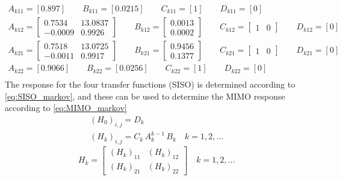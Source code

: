 \begin{equation}
    \begin{gathered}
        A_{k11}=[0.897] \qquad B_{k11}=[0.0215] \qquad C_{k11}=[1] \qquad D_{k11} = [0]\\
        A_{k12}=\begin{bmatrix} 0.7534 & 13.0837 \\ -0.0009 & 0.9926 \end{bmatrix} \qquad
        B_{k12}=\begin{bmatrix} 0.0013 \\ 0.0002 \end{bmatrix} \qquad
        C_{k12}=\begin{bmatrix} 1 & 0 \end{bmatrix} \qquad
        D_{k12} = [0]\\
        A_{k21}=\begin{bmatrix} 0.7518 & 13.0725 \\ -0.0011 & 0.9917 \end{bmatrix} \qquad
        B_{k21}=\begin{bmatrix} 0.9456 \\ 0.1377 \end{bmatrix} \qquad
        C_{k21}=\begin{bmatrix} 1 & 0 \end{bmatrix} \qquad
        D_{k21} = [0]\\
        A_{k22}=[0.9066] \qquad B_{k22}=[0.0256] \qquad C_{k22}=[1] \qquad D_{k22} = [0]\\
    \end{gathered}
\end{equation}
The response for the four transfer functions (SISO) is determined according to \cref{eq:SISO_markov}, and these can be used to determine the MIMO response according to \cref{eq:MIMO_markov}
\begin{equation}
    \begin{gathered}
        (H_0)_{i,j}=D_k\\
        (H_k)_{i,j}=C_k\,A^{k-1}_k\,B_k\quad k=1,2,\dots
    \end{gathered}
    \label{eq:SISO_markov}
\end{equation}
\begin{equation}
    H_k=
    \begin{bmatrix}
        (H_k)_{11} & (H_k)_{12}\\
        (H_k)_{21} & (H_k)_{22}
    \end{bmatrix}\quad k=1,2,\dots
    \label{eq:MIMO_markov}
\end{equation}
